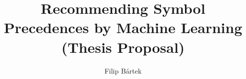 \usepackage{authblk}

\title{Recommending Symbol Precedences by Machine Learning (Thesis Proposal)}
\author{Filip Bártek}
